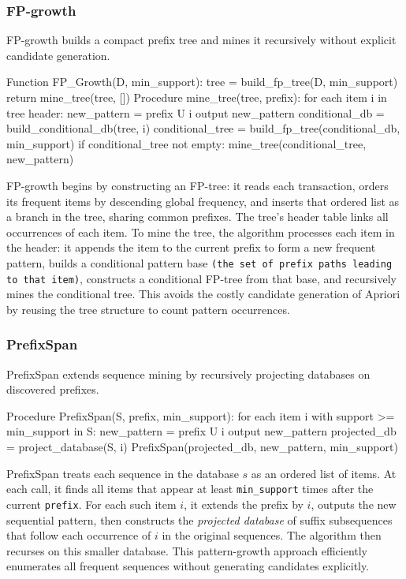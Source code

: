 \documentclass{article}
\begin{document}
\subsubsection{FP-growth}

FP-growth \cite{han2000mining} builds a compact prefix tree and mines it recursively without explicit candidate generation.

\begin{algpseudocode}
Function FP_Growth(D, min_support):
    tree = build_fp_tree(D, min_support)
    return mine_tree(tree, [])
Procedure mine_tree(tree, prefix):
    for each item i in tree header:
        new_pattern = prefix U {i}
        output new_pattern
        conditional_db = build_conditional_db(tree, i)
        conditional_tree = build_fp_tree(conditional_db, min_support)
        if conditional_tree not empty:
            mine_tree(conditional_tree, new_pattern)
\end{algpseudocode}

FP-growth begins by constructing an FP-tree: it reads each transaction, orders its frequent items by descending global frequency, and inserts that ordered list as a branch in the tree, sharing common prefixes.  The tree's header table links all occurrences of each item.  To mine the tree, the algorithm processes each item in the header: it appends the item to the current prefix to form a new frequent pattern, builds a conditional pattern base \texttt{(the set of prefix paths leading to that item)}, constructs a conditional FP-tree from that base, and recursively mines the conditional tree.  This avoids the costly candidate generation of Apriori by reusing the tree structure to count pattern occurrences.

\subsubsection{PrefixSpan}

PrefixSpan \cite{pei2001prefixspan} extends sequence mining by recursively projecting databases on discovered prefixes.

\begin{algpseudocode}
Procedure PrefixSpan(S, prefix, min_support):
    for each item i with support >= min_support in S:
        new_pattern = prefix U {i}
        output new_pattern
        projected_db = project_database(S, i)
        PrefixSpan(projected_db, new_pattern, min_support)
\end{algpseudocode}

PrefixSpan treats each sequence in the database $s$ as an ordered list of items.  At each call, it finds all items that appear at least \texttt{min\_support} times after the current \texttt{prefix}.  For each such item $i$, it extends the prefix by $i$, outputs the new sequential pattern, then constructs the \emph{projected database} of suffix subsequences that follow each occurrence of $i$ in the original sequences.  The algorithm then recurses on this smaller database.  This pattern-growth approach efficiently enumerates all frequent sequences without generating candidates explicitly.
\end{document}
